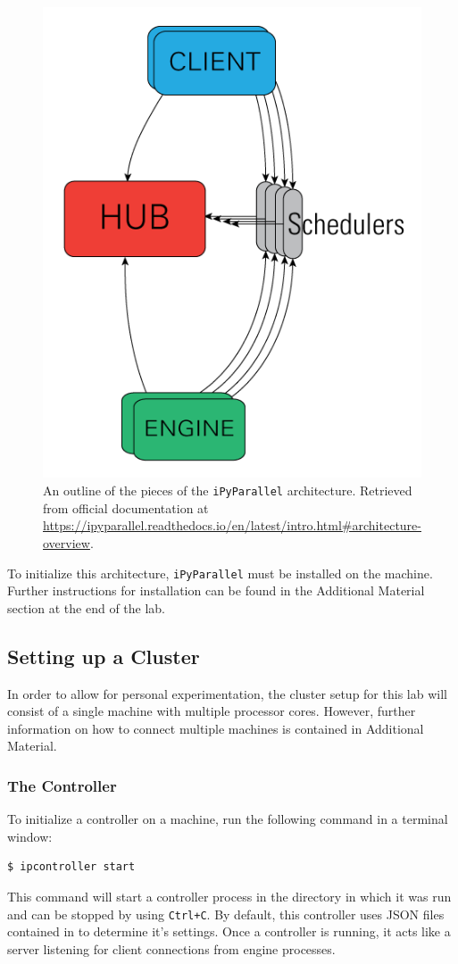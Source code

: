 \begin{figure}[H]
    \includegraphics[width=.4\textwidth]{figures/ipyarch.png}
\caption{An outline of the pieces of the \texttt{iPyParallel} architecture. Retrieved from official documentation at \url{https://ipyparallel.readthedocs.io/en/latest/intro.html\#architecture-overview}.}
\label{fig:ipyarch}
\end{figure}

To initialize this architecture, \texttt{iPyParallel} must be installed on the machine.
Further instructions for installation can be found in the Additional Material section at the end of the lab.

\subsection*{Setting up a Cluster}
In order to allow for personal experimentation, the cluster setup for this lab will consist of a single machine with multiple processor cores.
However, further information on how to connect multiple machines is contained in Additional Material.

\subsubsection*{The Controller}
To initialize a controller on a machine, run the following command in a terminal window:
\begin{lstlisting}[style=ShellInput]
$ ipcontroller start
\end{lstlisting}

This command will start a controller process in the directory in which it was run and can be stopped by using \texttt{Ctrl+C}.
By default, this controller uses JSON files contained in  to determine it's settings.
Once a controller is running, it acts like a server listening for client connections from engine processes.


